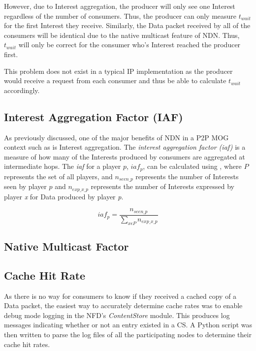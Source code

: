 However, due to Interest aggregation, the producer will only see one Interest regardless of the number of consumers. Thus, the producer can only measure $t_{wait}$ for the first Interest they receive. Similarly, the Data packet received by all of the consumers will be identical due to the native multicast feature of NDN. Thus, $t_{wait}$ will only be correct for the consumer who's Interest reached the producer first.

This problem does not exist in a typical IP implementation as the producer would receive a request from each consumer and thus be able to calculate $t_{wait}$ accordingly. 


\subsection{Interest Aggregation Factor (IAF)}
As previously discussed, one of the major benefits of NDN in a P2P MOG context such as \game{} is Interest aggregation. The \textit{interest aggregation factor (iaf)} is a measure of how many of the Interests produced by consumers are aggregated at intermediate hops. The \textit{iaf} for a player $p$, $iaf_p$, can be calculated using , where $P$ represents the set of all players, and $n_{seen\_p}$ represents the number of Interests seen by player $p$ and $n_{exp\_x\_p}$ represents the number of Interests expressed by player \textit{x} for Data produced by player \textit{p}.

\begin{equation}\label{eq:impl:iaf}
    iaf_p = \frac{n_{seen\_p}}{\sum\limits_{x \epsilon P}^{}{n_{exp\_x\_p}}}
\end{equation}

\subsection{Native Multicast Factor}

\subsection{Cache Hit Rate}
As there is no way for consumers to know if they received a cached copy of a Data packet, the easiest way to accurately determine cache rates was to enable debug mode logging in the NFD's \textit{ContentStore} module. This produces log messages indicating whether or not an entry existed in a CS. A Python script was then written to parse the log files of all the participating nodes to determine their cache hit rates.

